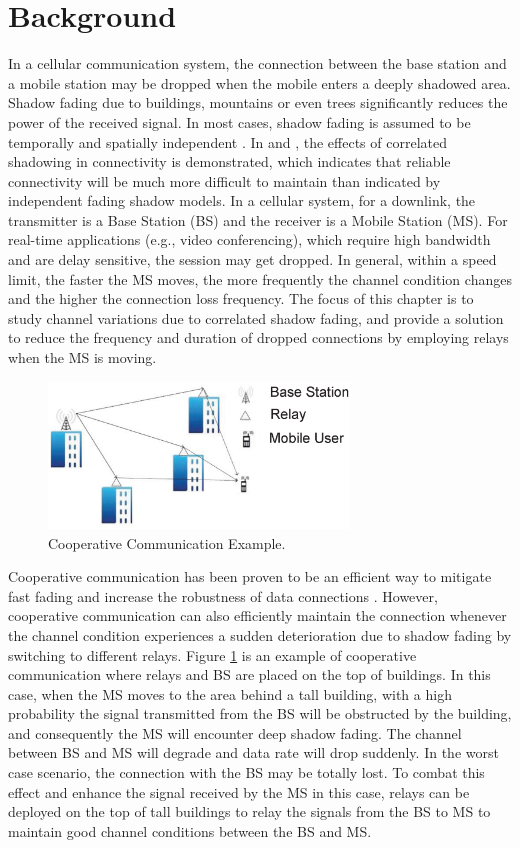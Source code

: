 \section{Background}
In a cellular communication system, the connection between the base station and a mobile station may be dropped when the mobile  enters a deeply shadowed area. Shadow fading due to buildings, mountains or even trees significantly reduces the power of the received signal. In most cases, shadow fading is assumed to be temporally and spatially independent \cite{rappaport1996wireless}. In \cite{fabbri2009impact} and \cite{patwari2008effects}, the effects of correlated shadowing in connectivity is demonstrated, which indicates that reliable connectivity will be much more difficult to maintain than indicated by independent fading shadow models. In a cellular system, for a downlink, the transmitter is a Base Station (BS) and the receiver is a Mobile Station (MS). For real-time applications (e.g., video conferencing), which require high bandwidth and are delay sensitive, the session may get dropped. In general, within a speed limit, the faster the MS moves, the more frequently the channel condition changes and the higher the connection loss frequency. The focus of this chapter is to study channel variations due to correlated shadow fading, and provide a solution to reduce the frequency and duration of dropped connections by employing relays when the MS is moving.
\begin{figure}
\centering
\includegraphics[width=8cm]{buildingversion2.eps}
\caption{Cooperative Communication Example.}
\label{building}
\end{figure}
\par Cooperative communication has been proven to be an efficient way to mitigate fast fading and increase the robustness of data connections \cite{chang2009performance,lee2009performance}. However, cooperative communication can also efficiently maintain the connection whenever the channel condition experiences a sudden deterioration due to shadow fading by switching to different relays. Figure \ref{building} is an example of cooperative communication where relays and BS are placed on the top of buildings. In this case, when the MS moves to the area behind a tall building, with a high probability the signal transmitted from the BS will be obstructed by the building, and consequently the MS will encounter deep shadow fading. The channel  between BS and MS will degrade and data rate will drop suddenly. In the worst case scenario, the connection with the BS may be totally lost. To combat this effect and enhance the signal received by the MS in this case, relays can be deployed on the top of tall buildings to relay the signals from the BS to MS to maintain good channel conditions between the BS and MS.
